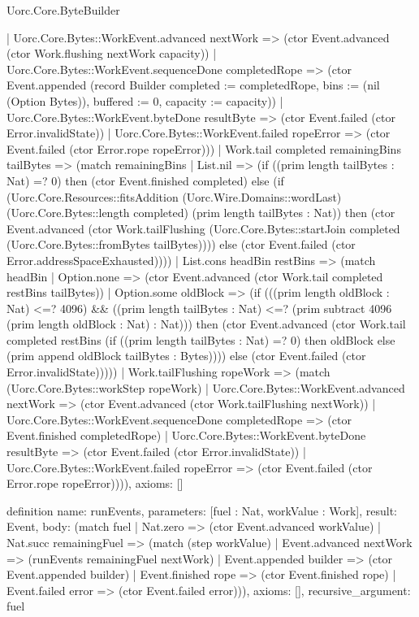 \begin{lexlean}{Uorc.Core.ByteBuilder}
\begin{semanticmodule}
{      | Uorc.Core.Bytes::WorkEvent.advanced nextWork => (ctor Event.advanced (ctor Work.flushing nextWork capacity))
      | Uorc.Core.Bytes::WorkEvent.sequenceDone completedRope => (ctor Event.appended (record Builder {completed := completedRope, bins := (nil (Option Bytes)), buffered := 0, capacity := capacity}))
      | Uorc.Core.Bytes::WorkEvent.byteDone resultByte => (ctor Event.failed (ctor Error.invalidState))
      | Uorc.Core.Bytes::WorkEvent.failed ropeError => (ctor Event.failed (ctor Error.rope ropeError)))
    | Work.tail completed remainingBins tailBytes => (match remainingBins
      | List.nil => (if ((prim length tailBytes : Nat) =? 0) then (ctor Event.finished completed) else (if (Uorc.Core.Resources::fitsAddition (Uorc.Wire.Domains::wordLast) (Uorc.Core.Bytes::length completed) (prim length tailBytes : Nat)) then (ctor Event.advanced (ctor Work.tailFlushing (Uorc.Core.Bytes::startJoin completed (Uorc.Core.Bytes::fromBytes tailBytes)))) else (ctor Event.failed (ctor Error.addressSpaceExhausted))))
      | List.cons headBin restBins => (match headBin
        | Option.none => (ctor Event.advanced (ctor Work.tail completed restBins tailBytes))
        | Option.some oldBlock => (if (((prim length oldBlock : Nat) <=? 4096) && ((prim length tailBytes : Nat) <=? (prim subtract 4096 (prim length oldBlock : Nat) : Nat))) then (ctor Event.advanced (ctor Work.tail completed restBins (if ((prim length tailBytes : Nat) =? 0) then oldBlock else (prim append oldBlock tailBytes : Bytes)))) else (ctor Event.failed (ctor Error.invalidState)))))
    | Work.tailFlushing ropeWork => (match (Uorc.Core.Bytes::workStep ropeWork)
      | Uorc.Core.Bytes::WorkEvent.advanced nextWork => (ctor Event.advanced (ctor Work.tailFlushing nextWork))
      | Uorc.Core.Bytes::WorkEvent.sequenceDone completedRope => (ctor Event.finished completedRope)
      | Uorc.Core.Bytes::WorkEvent.byteDone resultByte => (ctor Event.failed (ctor Error.invalidState))
      | Uorc.Core.Bytes::WorkEvent.failed ropeError => (ctor Event.failed (ctor Error.rope ropeError)))),
  axioms: []
}

definition{
  name: runEvents,
  parameters: [fuel : Nat, workValue : Work],
  result: Event,
  body: (match fuel
    | Nat.zero => (ctor Event.advanced workValue)
    | Nat.succ remainingFuel => (match (step workValue)
      | Event.advanced nextWork => (runEvents remainingFuel nextWork)
      | Event.appended builder => (ctor Event.appended builder)
      | Event.finished rope => (ctor Event.finished rope)
      | Event.failed error => (ctor Event.failed error))),
  axioms: [],
  recursive_argument: fuel
}


\end{semanticmodule}
\end{lexlean}
